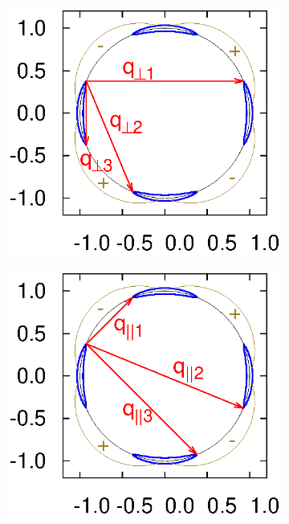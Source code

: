 \documentclass[usletter,aps,prb,10pt,amssymb,amsmath,twocolumn]{revtex4-1}
\begin{document}
 
  \begin{figure}
\caption{$\bf q^*$}\label{fig:qq}
        \centering
        \begin{subfigure}[b]{0.23\textwidth}

                \includegraphics[scale=0.55]{./figures/Bananas_with_q_xx.eps}

        \end{subfigure}
         \begin{subfigure}[b]{0.23\textwidth}

                \includegraphics[scale = 0.55]{./figures/Bananas_with_q_zz.eps}

        \end{subfigure}
 \end{figure}
\end{document}
